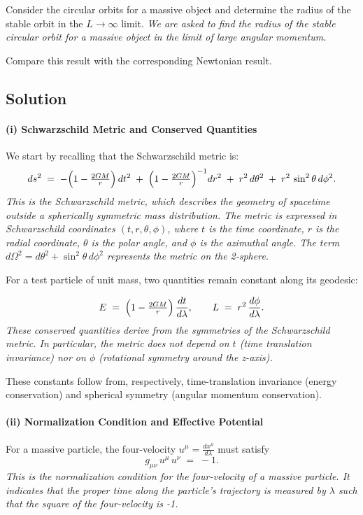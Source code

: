 \documentclass{article}
\begin{document}
Consider the circular orbits for a massive object and determine the radius of the stable orbit in the $L \rightarrow \infty$ limit. \textit{We are asked to find the radius of the stable circular orbit for a massive object in the limit of large angular momentum.}

Compare this result with the corresponding Newtonian result.

\subsection*{Solution}

\paragraph{(i) Schwarzschild Metric and Conserved Quantities}

We start by recalling that the Schwarzschild metric is:
\[
ds^2 \;=\; -\Bigl(1 - \tfrac{2GM}{r}\Bigr)\,dt^2
\;+\;\Bigl(1 - \tfrac{2GM}{r}\Bigr)^{-1} dr^2
\;+\; r^2\,d\theta^2
\;+\; r^2\,\sin^2\theta\,d\phi^2.
\]
\textit{This is the Schwarzschild metric, which describes the geometry of spacetime outside a spherically symmetric mass distribution. The metric is expressed in Schwarzschild coordinates $(t, r, \theta, \phi)$, where $t$ is the time coordinate, $r$ is the radial coordinate, $\theta$ is the polar angle, and $\phi$ is the azimuthal angle. The term $d\Omega^2 = d\theta^2 + \sin^2\theta \, d\phi^2$ represents the metric on the 2-sphere.}

For a test particle of unit mass, two quantities remain constant along its geodesic:

\[
E \;=\; \Bigl(1 - \tfrac{2GM}{r}\Bigr)\,\frac{dt}{d\lambda},
\quad\quad
L \;=\; r^{2}\,\frac{d\phi}{d\lambda}.
\]
\textit{These conserved quantities derive from the symmetries of the Schwarzschild metric. In particular, the metric does not depend on $t$ (time translation invariance) nor on $\phi$ (rotational symmetry around the z-axis).}

These constants follow from, respectively, time-translation invariance (energy conservation) and spherical symmetry (angular momentum conservation).

\paragraph{(ii) Normalization Condition and Effective Potential}

For a massive particle, the four-velocity $u^\mu = \frac{dx^\mu}{d\lambda}$ must satisfy
\[
g_{\mu\nu}\,u^\mu\,u^\nu \;=\; -1.
\]
\textit{This is the normalization condition for the four-velocity of a massive particle. It indicates that the proper time along the particle's trajectory is measured by $\lambda$ such that the square of the four-velocity is -1.}
\end{document}
